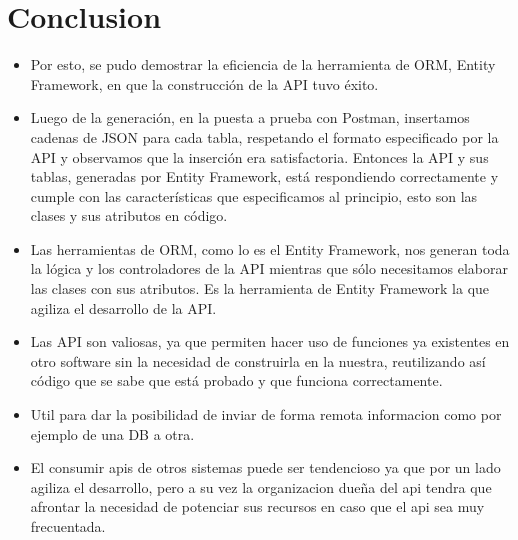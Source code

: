 \section{Conclusion} 

\begin{itemize}


	\item Por esto, se pudo demostrar la eficiencia de la herramienta de ORM, Entity Framework, en que la construcción de la API tuvo éxito.
	\item Luego de la generación, en la puesta a prueba con Postman, insertamos cadenas de JSON para cada tabla, respetando el formato especificado por la API y observamos que la inserción era satisfactoria. Entonces la API y sus tablas, generadas por Entity Framework, está respondiendo correctamente y cumple con las características que especificamos al principio, esto son las clases y sus atributos en código.
	\item Las herramientas de ORM, como lo es el Entity Framework, nos generan toda la lógica y los controladores de la API mientras que sólo necesitamos elaborar las clases con sus atributos. Es la herramienta de Entity Framework la que agiliza el desarrollo de la API.
	\item Las API son valiosas, ya que  permiten hacer uso de funciones ya existentes en otro software sin la necesidad de construirla en la nuestra, reutilizando así código que se sabe que está probado y que funciona correctamente.
	\item Util para dar la posibilidad de inviar de forma remota informacion como por ejemplo de una DB a otra.
	\item El consumir apis de otros sistemas puede ser tendencioso ya que por un lado agiliza el desarrollo, pero a su vez la organizacion dueña del api tendra que afrontar la necesidad de potenciar sus recursos en caso que el api sea muy frecuentada.


\end{itemize}
